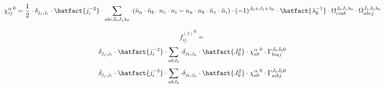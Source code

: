 
\begin{dmath*}
{\chi^{\alpha}_{i j}}^{0} = \frac{1}{2} \cdot \delta_{{j}_{j},{j}_{i}} \cdot \hatfact{{j}_{i}^{-2}} \cdot \sum_{a b c {J}_{0} {J}_{1} {{\lambda}}_{0}} \cdot (\bar{n}_{a} \cdot \bar{n}_{b} \cdot n_{c} \cdot n_{i} -n_{a} \cdot n_{b} \cdot \bar{n}_{c} \cdot \bar{n}_{i}) \cdot (-1)^{{J}_{0}+{J}_{1}+{{\lambda}}_{0}} \cdot \hatfact{{{\lambda}}_{0}^{-1}} \cdot \Omega_{c i a b}^{{J}_{0} {J}_{1} {{\lambda}}_{0}} \cdot \Omega_{a b c j}^{{J}_{1} {J}_{0} {{\lambda}}_{0}}
\end{dmath*}

\begin{dmath*}
{f^{(I)}_{i j}}^{0} = 
\end{dmath*}
\begin{dmath*}
\delta_{{j}_{j},{j}_{i}} \cdot \hatfact{{j}_{i}^{-2}} \cdot \sum_{a b {J}_{0}} \cdot \delta_{{j}_{b},{j}_{a}} \cdot \hatfact{{J}_{0}^{2}} \cdot {\chi^{\alpha}_{a b}}^{0} \cdot \Gamma_{b i a j}^{{J}_{0} {J}_{0} 0}
\end{dmath*}
\begin{dmath*}
\delta_{{j}_{j},{j}_{i}} \cdot \hatfact{{j}_{i}^{-2}} \cdot \sum_{a b {J}_{0}} \cdot \delta_{{j}_{b},{j}_{a}} \cdot \hatfact{{J}_{0}^{2}} \cdot {\chi^{\alpha}_{a b}}^{0} \cdot \Gamma_{a i b j}^{{J}_{0} {J}_{0} 0}
\end{dmath*}

